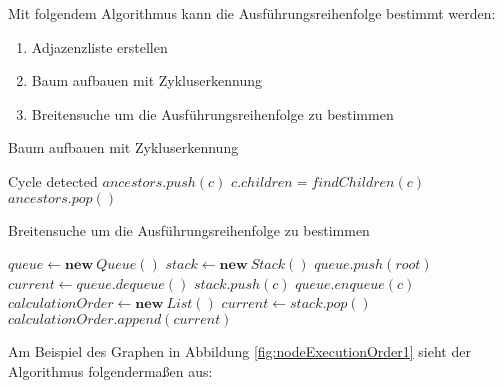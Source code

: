 
Mit folgendem Algorithmus kann die Ausführungsreihenfolge bestimmt werden:
\begin{enumerate}
    \item Adjazenzliste erstellen
    \item Baum aufbauen mit Zykluserkennung
    \item Breitensuche um die Ausführungsreihenfolge zu bestimmen 
\end{enumerate}

\begin{algorithm}[H]
    \caption{Baum aufbauen mit Zykluserkennung}
    \begin{algorithmic}[1]
                    \State Cycle detected
                \EndIf
                \State $ancestors.push(c)$
                \State $c.children = findChildren(c)$
                \State {}
                \State $ancestors.pop()$
            \EndFor
        \EndFunction
    \end{algorithmic}
\end{algorithm}

\begin{algorithm}[H]
    \caption{Breitensuche um die Ausführungsreihenfolge zu bestimmen}
    \begin{algorithmic}[1]
        \State $queue \gets \textbf{new} \ Queue()$
        \State $stack \gets \textbf{new} \ Stack()$
        \State $queue.push(root)$
            \State $current \gets queue.dequeue()$
                \State $stack.push(c)$
                \State $queue.enqueue(c)$
            \EndFor
        \EndWhile
        \State $calculationOrder \gets \textbf{new} \ List()$
            \State $current \gets stack.pop()$
                \State $calculationOrder.append(current)$
            \EndIf
        \EndWhile
    \end{algorithmic}
\end{algorithm}

Am Beispiel des Graphen in Abbildung \ref{fig:nodeExecutionOrder1} sieht der Algorithmus folgendermaßen aus:


